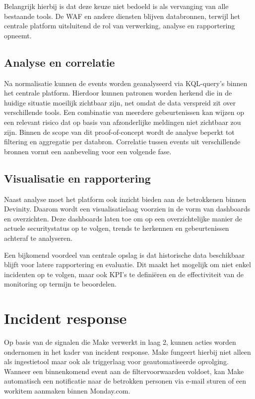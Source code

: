 Belangrijk hierbij is dat deze keuze niet bedoeld is als vervanging van alle bestaande tools. De WAF en andere diensten blijven databronnen, terwijl het centrale platform uitsluitend de rol van verwerking, analyse en rapportering opneemt.

\subsection{Analyse en correlatie}
Na normalisatie kunnen de events worden geanalyseerd via KQL-query's binnen het centrale platform. Hierdoor kunnen patronen worden herkend die in de huidige situatie moeilijk zichtbaar zijn, net omdat de data verspreid zit over verschillende tools. Een combinatie van meerdere gebeurtenissen kan wijzen op een relevant risico dat op basis van afzonderlijke meldingen niet zichtbaar zou zijn. Binnen de scope van dit proof-of-concept wordt de analyse beperkt tot filtering en aggregatie per databron. Correlatie tussen events uit verschillende bronnen vormt een aanbeveling voor een volgende fase.

\subsection{Visualisatie en rapportering}
Naast analyse moet het platform ook inzicht bieden aan de betrokkenen binnen Devinity. Daarom wordt een visualisatielaag voorzien in de vorm van dashboards en overzichten. Deze dashboards laten toe om op een overzichtelijke manier de actuele securitystatus op te volgen, trends te herkennen en gebeurtenissen achteraf te analyseren.

Een bijkomend voordeel van centrale opslag is dat historische data beschikbaar blijft voor latere rapportering en evaluatie. Dit maakt het mogelijk om niet enkel incidenten op te volgen, maar ook KPI's te definiëren en de effectiviteit van de monitoring op termijn te beoordelen.


\section{Incident response}
Op basis van de signalen die Make verwerkt in laag 2, kunnen acties worden ondernomen in het kader van incident response. Make fungeert hierbij niet alleen als ingestietool maar ook als triggerlaag voor geautomatiseerde opvolging. Wanneer een binnenkomend event aan de filtervoorwaarden voldoet, kan Make automatisch een notificatie naar de betrokken personen via e-mail sturen of een workitem aanmaken binnen Monday.com.

